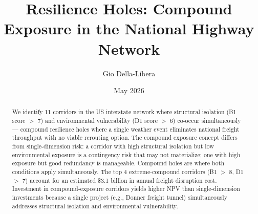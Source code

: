 \documentclass[12pt]{article}
\title{Resilience Holes: Compound Exposure in the National Highway Network}
\author{Gio Della-Libera}
\date{May 2026}
\begin{document}
\maketitle
\begin{abstract}
We identify 11 corridors in the US interstate network where structural isolation (B1 score $>$ 7) and environmental vulnerability (D1 score $>$ 6) co-occur simultaneously --- compound resilience holes where a single weather event eliminates national freight throughput with no viable rerouting option. The compound exposure concept differs from single-dimension risk: a corridor with high structural isolation but low environmental exposure is a contingency risk that may not materialize; one with high exposure but good redundancy is manageable. Compound holes are where both conditions apply simultaneously. The top 4 extreme-compound corridors (B1 $>$ 8, D1 $>$ 7) account for an estimated \$3.1 billion in annual freight disruption cost. Investment in compound-exposure corridors yields higher NPV than single-dimension investments because a single project (e.g., Donner freight tunnel) simultaneously addresses structural isolation and environmental vulnerability.
\end{abstract}









\end{document}
